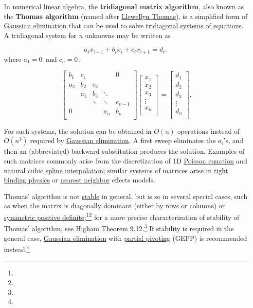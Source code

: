 \documentclass[]{article}
\date{}
\begin{document}
In \href{numerical_linear_algebra}{numerical linear algebra}, the
\textbf{tridiagonal matrix algorithm}, also known as the \textbf{Thomas
algorithm} (named after \href{Llewellyn_Thomas}{Llewellyn Thomas}), is a
simplified form of \href{Gaussian_elimination}{Gaussian elimination}
that can be used to solve \href{Tridiagonal_matrix}{tridiagonal systems
of equations}. A tridiagonal system for \emph{n} unknowns may be written
as

\[a_i x_{i - 1}  + b_i x_i  + c_i x_{i + 1}  = d_i , \,\!\] where
\(a_1  = 0\,\) and \(c_n = 0\,\).

\[\begin{bmatrix}
   {b_1} & {c_1} & {   } & {   } & { 0 } \\
   {a_2} & {b_2} & {c_2} & {   } & {   } \\
   {   } & {a_3} & {b_3} & \ddots & {   } \\
   {   } & {   } & \ddots & \ddots & {c_{n-1}}\\
   { 0 } & {   } & {   } & {a_n} & {b_n}\\
\end{bmatrix}
\begin{bmatrix}
   {x_1 }  \\
   {x_2 }  \\
   {x_3 }  \\
   \vdots   \\
   {x_n }  \\
\end{bmatrix}
=
\begin{bmatrix}
   {d_1 }  \\
   {d_2 }  \\
   {d_3 }  \\
   \vdots   \\
   {d_n }  \\
\end{bmatrix}
.\]

For such systems, the solution can be obtained in \(O(n)\) operations
instead of \(O(n^3)\) required by \href{Gaussian_elimination}{Gaussian
elimination}. A first sweep eliminates the \(a_i\)'s, and then an
(abbreviated) backward substitution produces the solution. Examples of
such matrices commonly arise from the discretization of 1D
\href{Poisson_equation}{Poisson equation} and natural cubic
\href{spline_interpolation}{spline interpolation}; similar systems of
matrices arise in \href{tight_binding}{tight binding physics} or
\href{nearest_neighbor}{nearest neighbor} effects models.

Thomas' algorithm is not \href{numerical_stability}{stable} in general,
but is so in several special cases, such as when the matrix is
\href{diagonally_dominant}{diagonally dominant} (either by rows or
columns) or \href{symmetric_positive_definite}{symmetric positive
definite};\footnote{}\footnote{} for a more precise characterization of
stability of Thomas' algorithm, see Higham Theorem 9.12.\footnote{} If
stability is required in the general case,
\href{Gaussian_elimination}{Gaussian elimination} with
\href{partial_pivoting}{partial pivoting} (GEPP) is recommended
instead.\footnote{}
\end{document}

